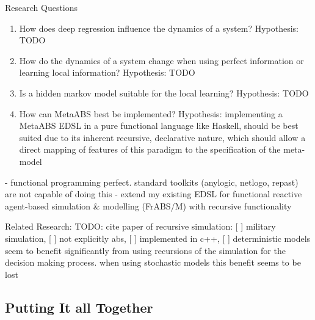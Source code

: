 Research Questions
\begin{enumerate}
	\item How does deep regression influence the dynamics of a system? Hypothesis: TODO
	\item How do the dynamics of a system change when using perfect information or learning local information? Hypothesis: TODO
	\item Is a hidden markov model suitable for the local learning? Hypothesis: TODO
	\item How can MetaABS best be implemented? Hypothesis: implementing a MetaABS EDSL in a pure functional language like Haskell, should be best suited due to its inherent recursive, declarative nature, which should allow a direct mapping of features of this paradigm to the specification of the meta-model
\end{enumerate}

- functional programming perfect. standard toolkits (anylogic, netlogo, repast) are not capable of doing this
- extend my existing EDSL for functional reactive agent-based simulation \& modelling (FrABS/M) with recursive functionality
 
Related Research:
TODO: \cite{gilmer_recursive_2000} cite paper of recursive simulation: [ ] military simulation, [ ] not explicitly abs, [ ] implemented in c++, [ ] deterministic models seem to benefit significantly from using recursions of the simulation for the decision making process. when using stochastic models this benefit seems to be lost

\subsection{Putting It all Together}


